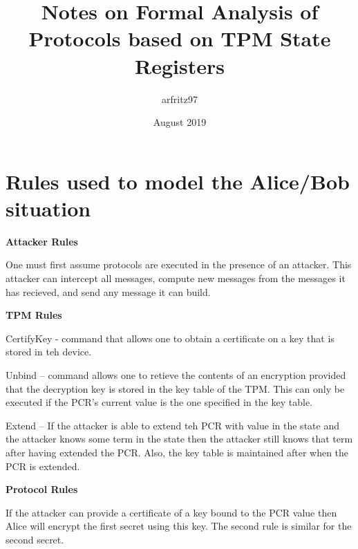 \documentclass{article}
\title{Notes on Formal Analysis of Protocols based on TPM State Registers}
\author{arfritz97 }
\date{August 2019}
\begin{document}
\section {Rules used to model the Alice/Bob situation}

\textbf {Attacker Rules}

 One must first assume protocols are executed in the presence
of an attacker. This attacker can intercept all messages,
compute new messages from the messages it has recieved,
and send any message it can build.

\textbf {TPM Rules}

CertifyKey - command that allows one to obtain a certificate
on a key that is stored in teh device. 

Unbind -- command allows one to retieve the contents of an
encryption provided that the decryption key is stored in 
the key table of the TPM. This can only be executed if the 
PCR's current value is the one specified in the key table.

Extend -- If the attacker is able to extend teh PCR with value
in the state and the attacker knows some term in the state then
the attacker still knows that term after having extended
the PCR. Also, the key table is maintained after when the 
PCR is extended.

\textbf {Protocol Rules}

If the attacker can provide a certificate of a key bound to 
the PCR value then Alice will encrypt the first secret using 
this key. The second rule is similar for the second secret.
\end{document}
